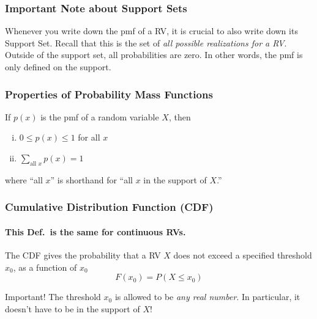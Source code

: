 \documentclass[handout]{beamer}
\begin{document}
\begin{frame}
\frametitle{Important Note about Support Sets}
Whenever you write down the pmf of a RV, it is \alert{crucial} to also write down its Support Set. Recall that this is the set of \alert{\emph{all possible realizations for a RV}}. Outside of the support set, all probabilities are zero. In other words, the pmf is \alert{only defined} on the support.

\end{frame}
\begin{frame}
\frametitle{Properties of Probability Mass Functions}

If $p(x)$ is the pmf of a random variable $X$, then
\begin{enumerate}[(i)]
	\item $0\leq p(x) \leq 1$ for all $x$ \vspace{1em}
	\item $\displaystyle \sum_{\mbox{all } x} p(x) = 1$
\end{enumerate}

\vspace{0.75em}
where ``all $x$'' is shorthand for ``all $x$ in the support of $X$.''

\end{frame}

\begin{frame}
\frametitle{Cumulative Distribution Function (CDF)}
\framesubtitle{This Def.\ is \alert{the same} for continuous RVs.}

The CDF gives the probability that a RV $X$ \alert{does not exceed} a specified threshold $x_0$, as a function of $x_0$
	$$F(x_0) = P(X \leq x_0)$$

\begin{alertblock}{Important!}
The threshold $x_0$ is allowed to be \emph{any real number}. In particular, it doesn't have to be in the support of $X$! 
\end{alertblock}

\end{frame}
\end{document}
